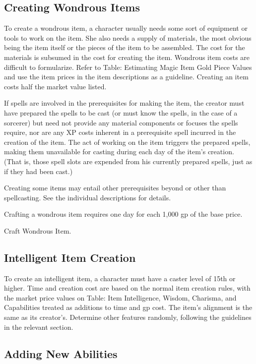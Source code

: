 \subsection{Creating Wondrous Items}

To create a wondrous item, a character usually needs some sort of equipment or tools to work on the item. She also needs a supply of materials, the most obvious being the item itself or the pieces of the item to be assembled. The cost for the materials is subsumed in the cost for creating the item. Wondrous item costs are difficult to formularize. Refer to Table: Estimating Magic Item Gold Piece Values and use the item prices in the item descriptions as a guideline. Creating an item costs half the market value listed.

If spells are involved in the prerequisites for making the item, the creator must have prepared the spells to be cast (or must know the spells, in the case of a sorcerer) but need not provide any material components or focuses the spells require, nor are any XP costs inherent in a prerequisite spell incurred in the creation of the item. The act of working on the item triggers the prepared spells, making them unavailable for casting during each day of the item's creation. (That is, those spell slots are expended from his currently prepared spells, just as if they had been cast.)

Creating some items may entail other prerequisites beyond or other than spellcasting. See the individual descriptions for details.

Crafting a wondrous item requires one day for each 1,000 gp of the base price.

 Craft Wondrous Item.

\subsection{Intelligent Item Creation}

To create an intelligent item, a character must have a caster level of 15th or higher. Time and creation cost are based on the normal item creation rules, with the market price values on Table: Item Intelligence, Wisdom, Charisma, and Capabilities treated as additions to time and gp cost. The item's alignment is the same as its creator's. Determine other features randomly, following the guidelines in the relevant section.

\subsection{Adding New Abilities}


